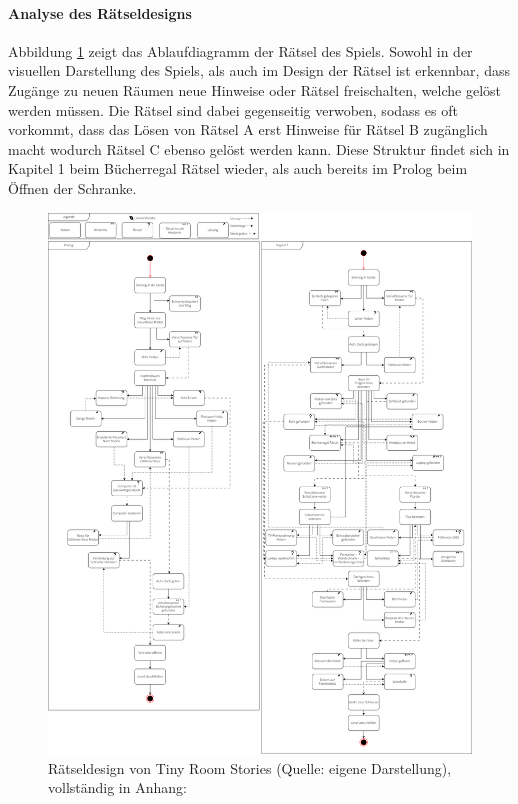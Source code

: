 \paragraph{Analyse des Rätseldesigns}
Abbildung \ref{fig:trs-uml} zeigt das Ablaufdiagramm der Rätsel des Spiels. Sowohl in der visuellen Darstellung des Spiels, als auch im Design der Rätsel ist erkennbar, dass Zugänge zu neuen Räumen neue Hinweise oder Rätsel freischalten, welche gelöst werden müssen. Die Rätsel sind dabei gegenseitig verwoben, sodass es oft vorkommt, dass das Lösen von Rätsel A erst Hinweise für Rätsel B zugänglich macht wodurch Rätsel C ebenso gelöst werden kann. Diese Struktur findet sich in Kapitel 1 beim Bücherregal Rätsel wieder, als auch bereits im Prolog beim Öffnen der Schranke.

\begin{figure}[ht]
\centering
\includegraphics[width=1\linewidth]{content/pictures/TinyRoomStoriesUML.png}
\caption{Rätseldesign von Tiny Room Stories (Quelle: eigene Darstellung), vollständig in Anhang: }
\label{fig:trs-uml}
\end{figure}

